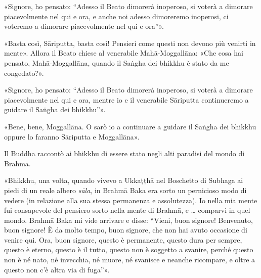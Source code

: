 «Signore, ho pensato: “Adesso il Beato dimorerà inoperoso, si voterà a
dimorare piacevolmente nel qui e ora, e anche noi adesso dimoreremo
inoperosi, ci voteremo a dimorare piacevolmente nel qui e ora”».


«Basta così, Sāriputta, basta così! Pensieri come questi non devono più
venirti in mente». Allora il Beato chiese al venerabile Mahā-Moggallāna:
«Che cosa hai pensato, Mahā-Moggallāna, quando il Saṅgha dei bhikkhu è
stato da me congedato?».


«Signore, ho pensato: “Adesso il Beato dimorerà inoperoso, si voterà a
dimorare piacevolmente nel qui e ora, mentre io e il venerabile
Sāriputta continueremo a guidare il Saṅgha dei bhikkhu”».


«Bene, bene, Moggallāna. O sarò io a continuare a guidare il Saṅgha dei
bhikkhu oppure lo faranno Sāriputta e Moggallāna».




 Il Buddha raccontò ai bhikkhu di essere stato negli
alti paradisi del mondo di Brahmā.


 «Bhikkhu, una volta, quando vivevo a Ukkaṭṭhā nel Boschetto
di Subhaga ai piedi di un reale albero \emph{sāla}, in Brahmā Baka era sorto
un pernicioso modo di vedere (in relazione alla sua stessa permanenza e
assolutezza). Io nella mia mente fui consapevole del pensiero sorto
nella mente di Brahmā, e … comparvi in quel mondo. Brahmā Baka mi vide
arrivare e disse: “Vieni, buon signore! Benvenuto, buon signore! È da
molto tempo, buon signore, che non hai avuto occasione di venire qui.
Ora, buon signore, questo è permanente, questo dura per sempre, questo è
eterno, questo è il tutto, questo non è soggetto a svanire, perché
questo non è né nato, né invecchia, né muore, né svanisce e neanche
ricompare, e oltre a questo non c’è altra via di fuga”».


